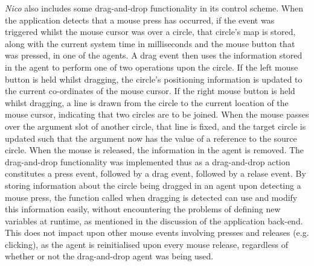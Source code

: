 \documentclass[12pt,twoside,notitlepage,xetex]{report}
\begin{document}
\emph{Nico} also includes some drag-and-drop functionality in its control scheme.  When the application detects that a mouse press has occurred, if the event was triggered whilst the mouse cursor was over a circle, that circle's map is stored, along with the current system time in milliseconds and the mouse button that was pressed, in one of the agents.  A drag event then uses the information stored in the agent to perform one of two operations upon the circle.  If the left mouse button is held whilst dragging, the circle's positioning information is updated to the current co-ordinates of the mouse cursor.  If the right mouse button is held whilst dragging, a line is drawn from the circle to the current location of the mouse cursor, indicating that two circles are to be joined.  When the mouse passes over the argument slot of another circle, that line is fixed, and the target circle is updated such that the argument now has the value of a reference to the source circle.  When the mouse is released, the information in the agent is removed.  The drag-and-drop functionality was implemented thus as a drag-and-drop action constitutes a press event, followed by a drag event, followed by a relase event.  By storing information about the circle being dragged in an agent upon detecting a mouse press, the function called when dragging is detected can use and modify this information easily, without encountering the problems of defining new variables at runtime, as mentioned in the discussion of the application back-end.  This does not impact upon other mouse events involving presses and releases (e.g. clicking), as the agent is reinitialised upon every mouse release, regardless of whether or not the drag-and-drop agent was being used.

%
%
\end{document}

